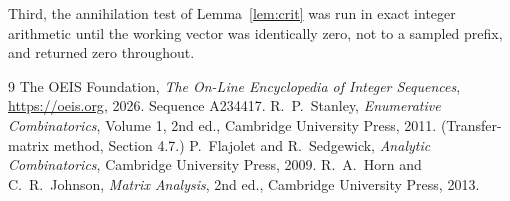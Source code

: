 \documentclass[11pt,a4paper]{article}
\theoremstyle{plain}
\theoremstyle{definition}
\begin{document}
Third, the annihilation test of Lemma~\ref{lem:crit} was run in exact integer arithmetic
until the working vector was identically zero, not to a sampled prefix, and returned zero
throughout.

\begin{thebibliography}{9}
 The OEIS Foundation, \emph{The On-Line Encyclopedia of Integer
Sequences}, \url{https://oeis.org}, 2026. Sequence A234417.
 R.~P.~Stanley, \emph{Enumerative Combinatorics}, Volume 1, 2nd ed.,
Cambridge University Press, 2011. (Transfer-matrix method, Section 4.7.)
 P.~Flajolet and R.~Sedgewick, \emph{Analytic Combinatorics}, Cambridge
University Press, 2009.
 R.~A.~Horn and C.~R.~Johnson, \emph{Matrix Analysis}, 2nd ed., Cambridge
University Press, 2013.
\end{thebibliography}
\end{document}

